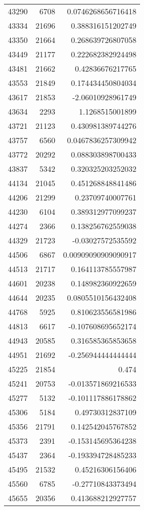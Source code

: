 \begin{tabular}{r | r | r}
43290 & 6708 & 0.0746268656716418 \\
43334 & 21696 & 0.388316151202749 \\
43350 & 21664 & 0.268639726807058 \\
43449 & 21177 & 0.222682382924498 \\
43481 & 21662 & 0.42836676217765 \\
43553 & 21849 & 0.174434450804034 \\
43617 & 21853 & -2.06010928961749 \\
43634 & 2293 & 1.1268515001899 \\
43721 & 21123 & 0.430981389744276 \\
43757 & 6560 & 0.0467836257309942 \\
43772 & 20292 & 0.088303898700433 \\
43837 & 5342 & 0.320325203252032 \\
44134 & 21045 & 0.451268848841486 \\
44206 & 21299 & 0.23709740007761 \\
44230 & 6104 & 0.389312977099237 \\
44274 & 2366 & 0.138256762559038 \\
44329 & 21723 & -0.03027572535592 \\
44506 & 6867 & 0.00909090909090917 \\
44513 & 21717 & 0.164113785557987 \\
44601 & 20238 & 0.148982360922659 \\
44644 & 20235 & 0.0805510156432408 \\
44768 & 5925 & 0.810623556581986 \\
44813 & 6617 & -0.107608695652174 \\
44943 & 20585 & 0.316585365853658 \\
44951 & 21692 & -0.256944444444444 \\
45225 & 21854 & 0.474 \\
45241 & 20753 & -0.013571869216533 \\
45277 & 5132 & -0.101117886178862 \\
45306 & 5184 & 0.49730312837109 \\
45356 & 21791 & 0.142542045767852 \\
45373 & 2391 & -0.153145695364238 \\
45437 & 2364 & -0.193394728485233 \\
45495 & 21532 & 0.45216306156406 \\
45560 & 6785 & -0.27710843373494 \\
45655 & 20356 & 0.413688212927757 \\

\end{tabular}

